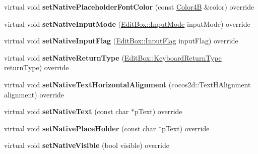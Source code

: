 \begin{DoxyCompactItemize}
\mbox{\label{classui_1_1EditBoxImplIOS_adae8c5da959d5080ba229dfb7247297e}} 
virtual void {\bfseries set\+Native\+Placeholder\+Font\+Color} (const \hyperlink{structColor4B}{Color4B} \&color) override
\item 
\mbox{\label{classui_1_1EditBoxImplIOS_a22acaf2e0d661ac2b54751f50d635ea0}} 
virtual void {\bfseries set\+Native\+Input\+Mode} (\hyperlink{classui_1_1EditBox_a7a1bfe8f3ba218bedfcf5451ec3ce01a}{Edit\+Box\+::\+Input\+Mode} input\+Mode) override
\item 
\mbox{\label{classui_1_1EditBoxImplIOS_af02856362bb53724c705f0f9233de5f2}} 
virtual void {\bfseries set\+Native\+Input\+Flag} (\hyperlink{classui_1_1EditBox_af02f13ee9fba51d59bb3111e200848c8}{Edit\+Box\+::\+Input\+Flag} input\+Flag) override
\item 
\mbox{\label{classui_1_1EditBoxImplIOS_ace6659077307b84314a28a546ee7848b}} 
virtual void {\bfseries set\+Native\+Return\+Type} (\hyperlink{classui_1_1EditBox_a1e1285b6f742975b26bdeb8108ca6e51}{Edit\+Box\+::\+Keyboard\+Return\+Type} return\+Type) override
\item 
\mbox{\label{classui_1_1EditBoxImplIOS_adc72d6352c06557517e06a48a41916b3}} 
virtual void {\bfseries set\+Native\+Text\+Horizontal\+Alignment} (cocos2d\+::\+Text\+H\+Alignment alignment) override
\item 
\mbox{\label{classui_1_1EditBoxImplIOS_ace47415994b2799d657831aed0d7ed95}} 
virtual void {\bfseries set\+Native\+Text} (const char $\ast$p\+Text) override
\item 
\mbox{\label{classui_1_1EditBoxImplIOS_ac7ee3d30b0890618d68af5d0a9ad8a20}} 
virtual void {\bfseries set\+Native\+Place\+Holder} (const char $\ast$p\+Text) override
\item 
\mbox{\label{classui_1_1EditBoxImplIOS_acbeb10487fdfc3bc07468494d80b9683}} 
virtual void {\bfseries set\+Native\+Visible} (bool visible) override
\item 
\mbox{\label{classui_1_1EditBoxImplIOS_a723a0c9ac777acbff5159f472fd43acc}} 

\end{DoxyCompactItemize}
